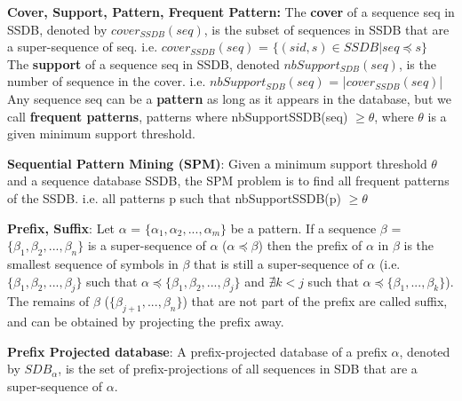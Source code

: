 \documentclass{eplmastersthesis}
\begin{document}
\begin{definition}{\bfseries Cover, Support, Pattern, Frequent Pattern:}
The \textbf{cover} of a sequence seq in SSDB, denoted by $cover_{SSDB}(seq)$, is the subset of sequences in SSDB that are a super-sequence of seq. i.e. $cover_{SSDB}(seq)$ = $\{(sid, s) \in SSDB | seq \preceq s\}$ \\
The \textbf{support} of a sequence seq in SSDB, denoted $nbSupport_{SDB}(seq)$, is the number of sequence in the cover. i.e. $nbSupport_{SDB}(seq)$ = |$cover_{SSDB}(seq)$|\\
Any sequence seq can be a \textbf{pattern} as long as it appears in the database, but we call \textbf{frequent patterns}, patterns where nbSupportSSDB(seq) $\geq \theta$, where $\theta$ is a
given minimum support threshold.
\end{definition}

\begin{definition}{\bfseries Sequential Pattern Mining (SPM)}:
Given a minimum support threshold $\theta$ and a sequence database SSDB, the SPM problem is to find all frequent patterns of the SSDB. i.e. all patterns p such that nbSupportSSDB(p) $\geq \theta$
\end{definition}

\begin{definition}{\bfseries Prefix, Suffix}:
Let $\alpha$ = $\{\alpha_1, \alpha_2, ..., \alpha_m\}$ be a pattern. If a sequence  $\beta$ = $\{\beta_1, \beta_2, ..., \beta_n\}$ is a super-sequence of $\alpha$ ($\alpha  \preceq \beta$) then the prefix of $\alpha$ in $\beta$ is the smallest sequence of symbols in $\beta$ that is still a super-sequence of $\alpha$ (i.e. $\{\beta_1, \beta_2, ..., \beta_j\}$ such that $\alpha \preceq \{\beta_1, \beta_2, ..., \beta_j\}$ and $\nexists k < j$ such that $\alpha \preceq \{\beta_1, ..., \beta_k\}$). \\
The remains of $\beta$ ($\{\beta_{j+1}, ..., \beta_n\}$) that are not part of the prefix are called suffix, and can be obtained by projecting the prefix away.
\end{definition}

\begin{definition}{\bfseries Prefix Projected database}:
A prefix-projected database of a prefix $\alpha$, denoted by $SDB_\alpha$, is the set of prefix-projections of all sequences in SDB that are a super-sequence of $\alpha$.
\end{definition}
\end{document}
